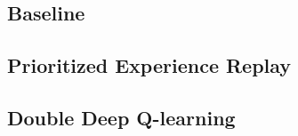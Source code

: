 \subsection{Baseline}\label{sec:agent-dqn-baseline}


\subsection{Prioritized Experience Replay}\label{sec:agent-dqn-per}


\subsection{Double Deep Q-learning}\label{sec:agent-dqn-ddqn}

